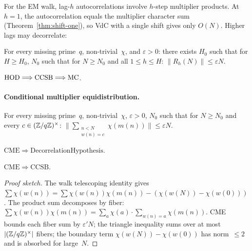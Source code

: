 For the EM walk, lag-$h$ autocorrelations involve $h$-step multiplier
products.  At $h = 1$, the autocorrelation equals the multiplier
character sum (Theorem~\ref{thm:shift-one}), so VdC with a single
shift gives only $O(N)$.  Higher lags may decorrelate:

\begin{property}
For every missing prime~$q$, non-trivial~$\chi$, and $\varepsilon > 0$:
there exists $H_0$ such that for $H \geq H_0$, $N_0$ such that for
$N \geq N_0$ and all $1 \leq h \leq H$:
$\|R_h(N)\| \leq \varepsilon N$.
\end{property}

\begin{theorem}
\label{thm:hod-mc}
$\mathrm{HOD} \Longrightarrow \mathrm{CCSB} \Longrightarrow \mathrm{MC}$.
\end{theorem}

\paragraph{Conditional multiplier equidistribution.}

\begin{property}
For every missing prime~$q$, non-trivial~$\chi$, $\varepsilon > 0$,
$N_0$ such that for $N \geq N_0$ and every
$c \in (\mathbb{Z}/q\mathbb{Z})^\times$:
$\|\sum_{\substack{n < N \\ w(n) = c}} \chi(m(n))\| \leq \varepsilon N$.
\end{property}

\begin{theorem}
$\mathrm{CME} \Longrightarrow \mathrm{DecorrelationHypothesis}$.
\end{theorem}

\begin{theorem}
\label{thm:cme-ccsb}
$\mathrm{CME} \Longrightarrow \mathrm{CCSB}$.
\end{theorem}

\begin{proof}[Proof sketch]
The walk telescoping identity gives
$\sum \chi(w(n)) = \sum \chi(w(n))\chi(m(n)) - (\chi(w(N)) - \chi(w(0)))$.
The product sum decomposes by fiber:
$\sum \chi(w(n))\chi(m(n)) = \sum_a \chi(a) \cdot \sum_{w(n)=a} \chi(m(n))$.
CME bounds each fiber sum by $\varepsilon' N$; the triangle inequality
sums over at most $|(\mathbb{Z}/q\mathbb{Z})^\times|$ fibers; the boundary term
$\chi(w(N)) - \chi(w(0))$ has norm~$\leq 2$ and is absorbed for large~$N$.
\end{proof}

